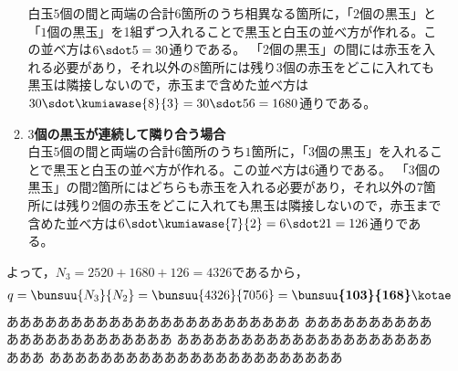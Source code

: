 \documentclass[../../../doc/main]{subfiles}
\begin{document}
\begin{enumerate}
\begin{enumerate}
                    白玉$5$個の間と両端の合計$ 6 $箇所のうち相異なる箇所に，「$ 2 $個の黒玉」と「$ 1 $個の黒玉」を1組ずつ入れることで黒玉と白玉の並べ方が作れる。この並べ方は$ 6 \sdot 5 = 30 $通りである。
                    「2個の黒玉」の間には赤玉を入れる必要があり，それ以外の$ 8 $箇所には残り$ 3 $個の赤玉をどこに入れても黒玉は隣接しないので，赤玉まで含めた並べ方は$ 30 \sdot \kumiawase{8}{3} = 30 \sdot 56 = 1680 $通りである。
                \item [\tokeisan]
                    {\bf $3$個の黒玉が連続して隣り合う場合} \\
                    白玉$ 5 $個の間と両端の合計$ 6 $箇所のうち$ 1 $箇所に，「3個の黒玉」を入れることで黒玉と白玉の並べ方が作れる。この並べ方は$ 6 $通りである。
                    「3個の黒玉」の間$ 2 $箇所にはどちらも赤玉を入れる必要があり，それ以外の$ 7 $箇所には残り$ 2 $個の赤玉をどこに入れても黒玉は隣接しないので，赤玉まで含めた並べ方は$ 6 \sdot \kumiawase{7}{2} = 6 \sdot 21 = 126 $通りである。
            \end{enumerate}
        よって，$ N_3 = 2520 + 1680 + 126 = 4326 $であるから，
        \begin{align*}
            q = \bunsuu{N_3}{N_2} = \bunsuu{4326}{7056} = \boldsymbol{\bunsuu{103}{168}} \kotae
        \end{align*}
        あああああああああああああああああああああああ
        あああああああああああああああああああああああ
        あああああああああああああああああああああああ
        あああああああああああああああああああああああ
    \end{enumerate}
\end{document}
